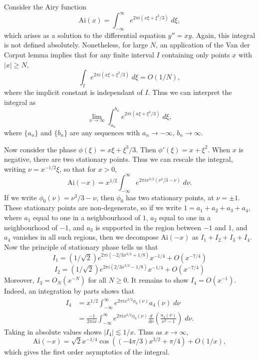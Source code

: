 \begin{example}
  Consider the Airy function
  \[ \text{Ai}(x) = \int_{-\infty}^\infty e^{2 \pi i(x \xi + \xi^3/3)}\; d\xi, \]
  which arises as a solution to the differential equation $y'' = xy$. Again, this integral is not defined absolutely. Nonetheless, for large $N$, an application of the Van der Corput lemma implies that for any finite interval $I$ containing only points $x$ with $|x| \geq N$,
  \[ \int_I e^{2 \pi i(x \xi + \xi^3/3)}\; d\xi = O(1/N), \]
  where the implicit constant is independant of $I$. Thus we can interpret the integral as
  \[ \lim_{n \to \infty} \int_{a_n}^{b_n} e^{2 \pi i(x \xi + \xi^3/3)}\; d\xi, \]
  where $\{ a_n \}$ and $\{ b_n \}$ are any sequences with $a_n \to -\infty$, $b_n \to \infty$.

  Now consider the phase $\phi(\xi) = x \xi + \xi^3/3$. Then $\phi'(\xi) = x + \xi^2$. When $x$ is negative, there are two stationary points. Thus we can rescale the integral, writing $\nu = x^{-1/2} \xi$, so that for $x > 0$,
  \[ \text{Ai}(-x) = x^{1/2} \int_{-\infty}^\infty e^{2 \pi i x^{3/2}(\nu^3/3 - \nu)}\; d\nu. \]
  If we write $\phi_0(\nu) = \nu^3/3 - \nu$, then $\phi_0$ has two stationary points, at $\nu = \pm 1$. These stationary points are non-degenerate, so if we write $1 = a_1 + a_2 + a_3 + a_4$, where $a_1$ equal to one in a neighbourhood of $1$, $a_2$ equal to one in a neighbourhood of $-1$, and $a_3$ is supported in the region between $-1$ and $1$, and $a_4$ vanishes in all such regions, then we decompose $\text{Ai}(-x)$ as $I_1 + I_2 + I_3 + I_4$. Now the principle of stationary phase tells us that
  \[ I_1 = (1/\sqrt{2}) e^{2 \pi i (-2/3 x^{3/2} + 1/8)} x^{-1/4} + O(x^{-7/4}) \]
  \[ I_2 = (1/\sqrt{2}) e^{2 \pi i (2/3 x^{3/2} - 1/8)} x^{-1/4} + O(x^{-7/4}) \]
  Moreover, $I_3 = O_N(x^{-N})$ for all $N \geq 0$. It remains to show $I_4 = O(x^{-1})$. Indeed, an integration by parts shows that
  \begin{align*}
    I_4 &= x^{1/2} \int_{-\infty}^\infty e^{2 \pi i x^{3/2} \phi_0(\nu)} a_4(\nu)\; d\nu\\
    &= \frac{-1}{2 \pi i x} \int_{-\infty}^\infty e^{2 \pi i x^{3/2} \phi_0(\nu)} \frac{d}{d\nu} \left( \frac{a_4(\nu)}{\nu^2 - 1} \right)\; d\nu.
  \end{align*}
  Taking in absolute values shows $|I_4| \lesssim 1/x$. Thus as $x \to \infty$,
  \[ \text{Ai}(-x) = \sqrt{2} x^{-1/4} \cos((-4 \pi/3) x^{3/2} + \pi/4) + O(1/x), \]
  which gives the first order asymptotics of the integral.


\end{example}
